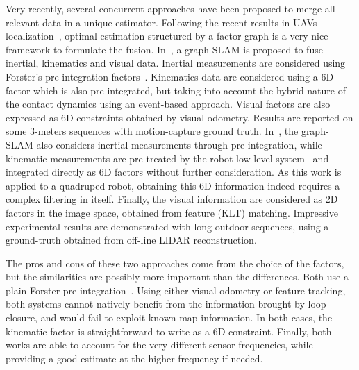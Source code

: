 Very recently, several concurrent approaches have been proposed to merge all relevant data in a unique estimator.
Following the recent results in UAVs localization~\cite{KAESS-11-ISAM2,leutenegger_keyframe_ijrr15}, optimal estimation 
structured by a factor graph is a very nice framework to formulate the fusion.
In~\cite{hartley_graphslam_iros18}, a graph-SLAM is proposed to fuse inertial, kinematics and visual data.
Inertial measurements are considered using Forster's pre-integration factors~\cite{forster2017-TRO}.
Kinematics data are considered using a 6D factor which is also pre-integrated, but taking into account the hybrid nature 
of the contact dynamics using an event-based approach.
Visual factors are also expressed as 6D constraints obtained by visual odometry.
Results are reported on some 3-meters sequences with motion-capture ground truth.
In~\cite{wisth2019robust}, the graph-SLAM also considers inertial measurements through pre-integration, while kinematic
 measurements are pre-treated by the robot low-level system~\cite{bloesch_odo_rss13} and integrated directly as 6D factors without further consideration.
As this work is applied to a quadruped robot, obtaining this 6D information indeed requires a complex filtering in itself. 
Finally, the visual information are considered as 2D factors in the image space, obtained from feature (KLT) matching.
Impressive experimental results are demonstrated with long outdoor sequences, using a ground-truth obtained from off-line LIDAR reconstruction.

The pros and cons of these two approaches come from the choice of the factors, but the similarities are possibly more important than the differences.
Both use a plain Forster pre-integration~\cite{forster2017-TRO}. 
Using either visual odometry or feature tracking, both systems cannot natively benefit from the information brought by loop closure, and would fail 
to exploit known map information.
In both cases, the kinematic factor is straightforward to write as a 6D constraint.
Finally, both works are able to account for the very different sensor frequencies, while providing a good estimate at the higher frequency if needed.

